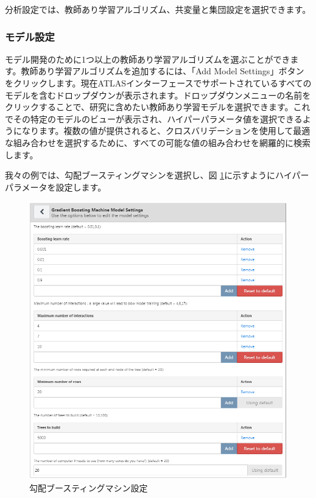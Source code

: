 \documentclass[
  11pt]{book}
\theoremstyle{definition}
\theoremstyle{definition}
\theoremstyle{definition}
\theoremstyle{definition}
\theoremstyle{remark}
\begin{document}
分析設定では、教師あり学習アルゴリズム、共変量と集団設定を選択できます。

\subsubsection*{モデル設定}\label{ux30e2ux30c7ux30ebux8a2dux5b9a}

モデル開発のために1つ以上の教師あり学習アルゴリズムを選ぶことができます。教師あり学習アルゴリズムを追加するには、「Add Model Settings」ボタンをクリックします。現在ATLASインターフェースでサポートされているすべてのモデルを含むドロップダウンが表示されます。ドロップダウンメニューの名前をクリックすることで、研究に含めたい教師あり学習モデルを選択できます。これでその特定のモデルのビューが表示され、ハイパーパラメータ値を選択できるようになります。複数の値が提供されると、クロスバリデーションを使用して最適な組み合わせを選択するために、すべての可能な値の組み合わせを網羅的に検索します。

我々の例では、勾配ブースティングマシンを選択し、図 \ref{fig:gbmSettings}に示すようにハイパーパラメータを設定します。

\begin{figure}

{\centering \includegraphics[width=1\linewidth]{images/PatientLevelPrediction/gbmSettings} 

}

\caption{勾配ブースティングマシン設定}\label{fig:gbmSettings}
\end{figure}
\end{document}
